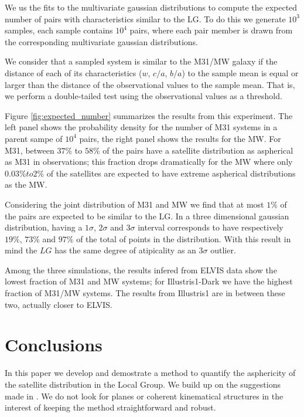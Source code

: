 \documentclass[a4paper,fleqn,usenatbib]{mnras}
\begin{document}
We us the fits to the multivariate gaussian distributions to
compute the expected number of pairs with characteristics similar to
the LG.
To do this we generate $10^3$ samples, each sample contains $10^4$
pairs, where each pair member is drawn from the corresponding
multivariate gaussian distributions.  

We consider that a sampled system is similar to the M31/MW galaxy if the
distance of each of its characteristics ($w$, $c/a$, $b/a$) to the
sample mean is equal or larger than the distance of the observational
values to the sample mean.   
That is, we perform a double-tailed test using the observational
values as a threshold. 

Figure \ref{fig:expected_number} summarizes the results from this
experiment. 
The left panel shows the probability density for the number of M31
systems in a parent sampe of $10^4$ pairs, the right panel shows the
results for the MW.
For M31, between $37\%$ to $58\%$ of the pairs have a satellite
distribution as aspherical as M31 in observations; this fraction drops
dramatically for the MW where only $0.03\% to 2\%$ of the satellites
are expected to have extreme aspherical distributions as the MW.

Considering the joint distribution of M31 and MW we find that at most
$1\%$ of the pairs are expected to be similar to the LG.
In a three dimensional gaussian distribution, having a $1\sigma$,
$2\sigma$ and $3\sigma$ interval corresponds to have respectively $19 \%$, $73 \%$ and
$97 \%$ of the total of points in the distribution.
With this result in mind the $LG$ has the same degree of atipicality
as an $3\sigma$ outlier. 

Among the three simulations, the results infered from ELVIS data show
the lowest fraction of M31 and MW systems; for Illustris1-Dark we have
the highest fraction of M31/MW systems. The results from Illustris1
are in between these two, actually closer to ELVIS.



\section{Conclusions}

In this paper we develop and demostrate a method to quantify the
asphericity of the satellite distribution in the Local Group.
We build up on the suggestions made in \cite{XX}.
We do not look for planes or coherent kinematical structures in the
interest of keeping the method straightforward and robust.
\end{document}
